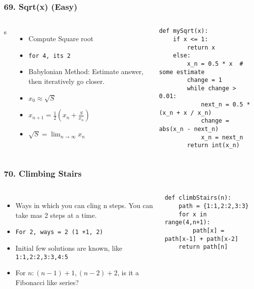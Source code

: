 \begin{frame}[fragile]\frametitle{69. Sqrt(x) (Easy)}

	\begin{columns}[T]
		s
	\begin{itemize}
	\item Compute Square root
	\item \lstinline{for 4, its 2}
	\item Babylonian Method: Estimate answer, then iteratively go closer.
	\item $x_0 \approx \sqrt{S}$
	\item $x_{n+1} = \frac{1}{2}(x_n + \frac{S}{x_n})$
	\item $\sqrt{S} = \lim_{n \rightarrow \infty} x_n$
	\end{itemize}
		\begin{lstlisting}[basicstyle=\scriptsize]
def mySqrt(x):
    if x <= 1:
        return x
    else:
        x_n = 0.5 * x  # some estimate
        change = 1
        while change > 0.01:
            next_n = 0.5 * (x_n + x / x_n)
            change = abs(x_n - next_n)
            x_n = next_n
        return int(x_n)

				\end{lstlisting}		

	\end{columns}
		
\end{frame}

\begin{frame}[fragile]\frametitle{70. Climbing Stairs}

	\begin{columns}[T]
	\begin{itemize}
	\item Ways in which you can cling n steps. You can take mas 2 steps at a time.
	\item \lstinline{For 2, ways = 2 (1 +1, 2)}
	\item Initial few solutions are known, like \lstinline{1:1,2:2,3:3,4:5}
	\item For $n: (n-1) + 1, (n -2 ) + 2$, is it a Fibonacci like series?
	\end{itemize}
		\begin{lstlisting}[basicstyle=\scriptsize]
def climbStairs(n):
    path = {1:1,2:2,3:3}
    for x in range(4,n+1):
        path[x] = path[x-1] + path[x-2]
    return path[n]
				\end{lstlisting}		

	\end{columns}
		
\end{frame}


